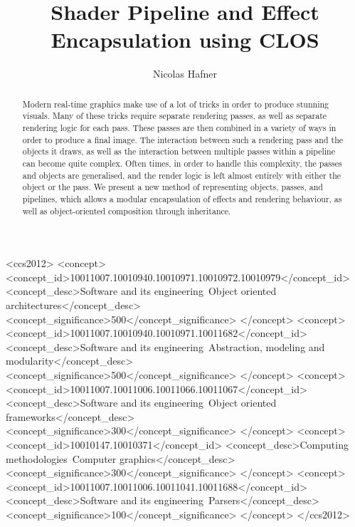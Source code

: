 \documentclass[format=sigconf]{acmart}
\begin{document}
\title{Shader Pipeline and Effect Encapsulation using CLOS}

\author{Nicolas Hafner}

\begin{abstract}
  Modern real-time graphics make use of a lot of tricks in order to produce stunning visuals. Many of these tricks require separate rendering passes, as well as separate rendering logic for each pass. These passes are then combined in a variety of ways in order to produce a final image. The interaction between such a rendering pass and the objects it draws, as well as the interaction between multiple passes within a pipeline can become quite complex. Often times, in order to handle this complexity, the passes and objects are generalised, and the render logic is left almost entirely with either the object or the pass. We present a new method of representing objects, passes, and pipelines, which allows a modular encapsulation of effects and rendering behaviour, as well as object-oriented composition through inheritance.
\end{abstract}

\begin{CCSXML}
  <ccs2012>
  <concept>
  <concept_id>10011007.10010940.10010971.10010972.10010979</concept_id>
  <concept_desc>Software and its engineering~Object oriented architectures</concept_desc>
  <concept_significance>500</concept_significance>
  </concept>
  <concept>
  <concept_id>10011007.10010940.10010971.10011682</concept_id>
  <concept_desc>Software and its engineering~Abstraction, modeling and modularity</concept_desc>
  <concept_significance>500</concept_significance>
  </concept>
  <concept>
  <concept_id>10011007.10011006.10011066.10011067</concept_id>
  <concept_desc>Software and its engineering~Object oriented frameworks</concept_desc>
  <concept_significance>300</concept_significance>
  </concept>
  <concept>
  <concept_id>10010147.10010371</concept_id>
  <concept_desc>Computing methodologies~Computer graphics</concept_desc>
  <concept_significance>300</concept_significance>
  </concept>
  <concept>
  <concept_id>10011007.10011006.10011041.10011688</concept_id>
  <concept_desc>Software and its engineering~Parsers</concept_desc>
  <concept_significance>100</concept_significance>
  </concept>
  </ccs2012>
\end{CCSXML}

\end{document}
